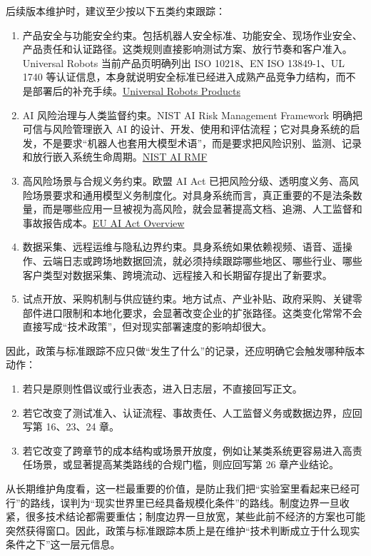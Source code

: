 后续版本维护时，建议至少按以下五类约束跟踪：

\begin{enumerate}
\item 产品安全与功能安全约束。包括机器人安全标准、功能安全、现场作业安全、产品责任和认证路径。这类规则直接影响测试方案、放行节奏和客户准入。Universal Robots 当前产品页明确列出 ISO 10218、EN ISO 13849-1、UL 1740 等认证信息，本身就说明安全标准已经进入成熟产品竞争力结构，而不是部署后的补充手续。\href{https://www.universal-robots.com/products/}{Universal Robots Products}
\item AI 风险治理与人类监督约束。NIST AI Risk Management Framework 明确把可信与风险管理嵌入 AI 的设计、开发、使用和评估流程；它对具身系统的启发，不是要求“机器人也套用大模型术语”，而是要求把风险识别、监测、记录和放行嵌入系统生命周期。\href{https://www.nist.gov/itl/ai-risk-management-framework}{NIST AI RMF}
\item 高风险场景与合规义务约束。欧盟 AI Act 已把风险分级、透明度义务、高风险场景要求和通用模型义务制度化。对具身系统而言，真正重要的不是法条数量，而是哪些应用一旦被视为高风险，就会显著提高文档、追溯、人工监督和事故报告成本。\href{https://digital-strategy.ec.europa.eu/en/policies/regulatory-framework-ai}{EU AI Act Overview}
\item 数据采集、远程运维与隐私边界约束。具身系统如果依赖视频、语音、遥操作、云端日志或跨场地数据回流，就必须持续跟踪哪些地区、哪些行业、哪些客户类型对数据采集、跨境流动、远程接入和长期留存提出了新要求。
\item 试点开放、采购机制与供应链约束。地方试点、产业补贴、政府采购、关键零部件进口限制和本地化要求，会显著改变企业的扩张路径。这类变化常常不会直接写成“技术政策”，但对现实部署速度的影响却很大。
\end{enumerate}

因此，政策与标准跟踪不应只做“发生了什么”的记录，还应明确它会触发哪种版本动作：

\begin{enumerate}
\item 若只是原则性倡议或行业表态，进入日志层，不直接回写正文。
\item 若它改变了测试准入、认证流程、事故责任、人工监督义务或数据边界，应回写第 16、23、24 章。
\item 若它改变了跨章节的成本结构或场景开放度，例如让某类系统更容易进入高责任场景，或显著提高某类路线的合规门槛，则应回写第 26 章产业结论。
\end{enumerate}

从长期维护角度看，这一栏最重要的价值，是防止我们把“实验室里看起来已经可行”的路线，误判为“现实世界里已经具备规模化条件”的路线。制度边界一旦收紧，很多技术结论都需要重估；制度边界一旦放宽，某些此前不经济的方案也可能突然获得窗口。因此，政策与标准跟踪本质上是在维护“技术判断成立于什么现实条件之下”这一层元信息。

